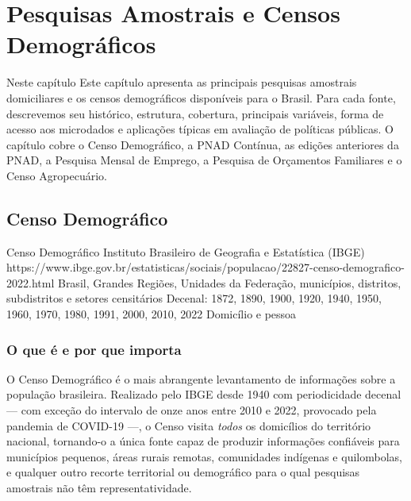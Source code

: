 
\chapter{Pesquisas Amostrais e Censos Demográficos}

\begin{boxdestaque}{Neste capítulo}
Este capítulo apresenta as principais pesquisas amostrais domiciliares e os censos demográficos disponíveis para o Brasil. Para cada fonte, descrevemos seu histórico, estrutura, cobertura, principais variáveis, forma de acesso aos microdados e aplicações típicas em avaliação de políticas públicas. O capítulo cobre o Censo Demográfico, a PNAD Contínua, as edições anteriores da PNAD, a Pesquisa Mensal de Emprego, a Pesquisa de Orçamentos Familiares e o Censo Agropecuário.
\end{boxdestaque}

\section{Censo Demográfico}

\ficharapida
  {Censo Demográfico}
  {Instituto Brasileiro de Geografia e Estatística (IBGE)}
  {https://www.ibge.gov.br/estatisticas/sociais/populacao/22827-censo-demografico-2022.html}
  {Brasil, Grandes Regiões, Unidades da Federação, municípios, distritos, subdistritos e setores censitários}
  {Decenal: 1872, 1890, 1900, 1920, 1940, 1950, 1960, 1970, 1980, 1991, 2000, 2010, 2022}
  {Domicílio e pessoa}

\subsection{O que é e por que importa}

O Censo Demográfico é o mais abrangente levantamento de informações sobre a população brasileira. Realizado pelo IBGE desde 1940 com periodicidade decenal --- com exceção do intervalo de onze anos entre 2010 e 2022, provocado pela pandemia de COVID-19 ---, o Censo visita \textit{todos} os domicílios do território nacional, tornando-o a única fonte capaz de produzir informações confiáveis para municípios pequenos, áreas rurais remotas, comunidades indígenas e quilombolas, e qualquer outro recorte territorial ou demográfico para o qual pesquisas amostrais não têm representatividade.

